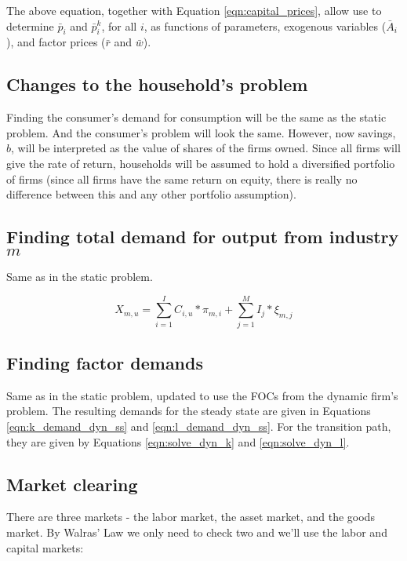 \documentclass[letterpaper,12pt]{article}
\theoremstyle{definition}
\begin{document}
\begin{spacing}{1.5}
The above equation, together with Equation \ref{eqn:capital_prices}, allow use to determine $\bar{p}_{i}$ and $\bar{p}^{k}_{i}$, for all $i$, as functions of parameters, exogenous variables ($\bar{A}_{i}$), and factor prices ($\bar{r}$ and $\bar{w}$).


\subsection*{Changes to the household's problem}

Finding the consumer's demand for consumption will be the same as the static problem.  And the consumer's problem will look the same.  However, now savings, $b$, will be interpreted as the value of shares of the firms owned.  Since all firms will give the rate of return, households will be assumed to hold a diversified portfolio of firms (since all firms have the same return on equity, there is really no difference between this and any other portfolio assumption).  

\subsection*{Finding total demand for output from industry $m$}

Same as in the static problem.

\begin{equation}
\label{eqn:output_demand_dyn}
X_{m,u} = \sum_{i=1}^{I}C_{i,u}*\pi_{m,i} + \sum_{j=1}^{M}I_{j}*\xi_{m,j}
\end{equation}

\subsection*{Finding factor demands}

Same as in the static problem, updated to use the FOCs from the dynamic firm's problem.  The resulting demands for the steady state are given in Equations \ref{eqn:k_demand_dyn_ss} and \ref{eqn:l_demand_dyn_ss}.  For the transition path, they are given by Equations \ref{eqn:solve_dyn_k} and \ref{eqn:solve_dyn_l}.


\subsection*{Market clearing}

There are three markets - the labor market, the asset market, and the goods market.  By Walras' Law we only need to check two and we'll use the labor and capital markets:


\end{spacing}
\end{document}
